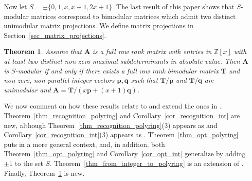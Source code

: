 \documentclass[a4paper, 11pt]{article}
\newcommand{\Z}{\mathbb{Z}}
\newcommand{\bA}{\bm{A}}
\newcommand{\bp}{\bm{p}}
\newcommand{\bq}{\bm{q}}
\newcommand{\bT}{\bm{T}}
\newcommand{\indet}{x}
\newcommand{\polyring}{\Z[\indet]}
\newcommand{\polyS}{S}
\newtheorem{theorem}{Theorem}
\begin{document}
	
	Now let $\polyS = \pm \lbrace 0,1,\indet,\indet + 1, 2\indet + 1\rbrace$. The last result of this paper shows that $\polyS$-modular matrices correspond to bimodular matrices which admit two distinct unimodular matrix projections. We define matrix projections in Section~\ref{sec_matrix_projections}.
	\begin{theorem}\label{thm_bimodular_matrix_projection}Assume that $\bA$ is a full row rank matrix with entries in $\polyring$ with at least two distinct non-zero maximal subdeterminants in absolute value. Then $\bA$ is $S$-modular if and only if there exists a full row rank bimodular matrix $\bT$ and non-zero, non-parallel integer vectors $\bp,\bq$ such that $\bT/\bp$ and $\bT/\bq$ are unimodular and $\bA=\bT/(x\bp+(x+1)\bq)$.
\end{theorem}

We now comment on how these results relate to and extend the ones in \cite{celayakuhlmannweismantel2024matricespolynomial}. Theorem~\ref{thm_recognition_polyring} and Corollary~\ref{cor_recognition_int} are new, although Theorem~\ref{thm_recognition_polyring}(3) appears as \cite[Lemma~8]{celayakuhlmannweismantel2024matricespolynomial} and Corollary~\ref{cor_recognition_int}(3) appears as \cite[Theorem~2]{celayakuhlmannweismantel2024matricespolynomial}. Theorem~\ref{thm_opt_polyring} puts \cite[Theorem~3]{celayakuhlmannweismantel2024matricespolynomial} in a more general context, and, in addition, both Theorem~\ref{thm_opt_polyring} and Corollary~\ref{cor_opt_int} generalize \cite[Theorem~3]{celayakuhlmannweismantel2024matricespolynomial} by adding $\pm 1$ to the set $\polyS$. Theorem~\ref{thm_from_integer_to_polyring} is an extension of \cite[Lemma~3]{celayakuhlmannweismantel2024matricespolynomial}. Finally, Theorem~\ref{thm_bimodular_matrix_projection} is new.
	
\end{document}
